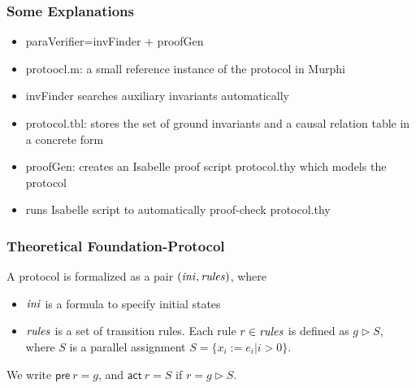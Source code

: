 \documentclass{beamer}
\newcommand{\forget}[1]{}
\begin{document}
\begin{frame}\frametitle{Some Explanations}

\begin{itemize}
\item {\sf paraVerifier}={\sf invFinder} + {\sf proofGen}

\item protoocl.m: a small reference instance of the   protocol in Murphi


\item {\sf invFinder} searches auxiliary invariants automatically

\item   protocol.tbl:  stores the set of ground invariants and a causal relation table in a concrete form

\item {\sf proofGen}: creates an Isabelle proof script {\sf protocol.thy} which models   the protocol

\item runs Isabelle script to automatically proof-check {\sf protocol.thy}
\end{itemize}

\end{frame}



\begin{frame}\frametitle{Theoretical Foundation-Protocol}
\noindent
A  protocol is formalized as a pair $({\it ini}, {\it rules})$, where
\begin{itemize}
\item ${\it ini}$ is a formula to specify initial states 
\item  ${\it rules}$ is a set of transition rules. Each rule $r\in {\it rules}$ is defined as
  $g \vartriangleright  S$, \forget{where $g$ is a predicate, and $S$ is a
  parallel assignment to distinct  variables $v_i$ with expressions
  $e_i$,} where $S$ is  a parallel assignment $S=\{x_i:=e_i | i>0\}$.
\end{itemize}
We write $\mathsf{pre}~r=g$, and $\mathsf{act}~r=S$
  if $r=g \vartriangleright S$.
\end{frame}
\end{document}
